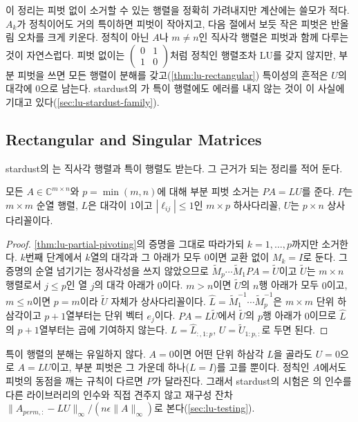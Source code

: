 이 정리는 피벗 없이 소거할 수 있는 행렬을 정확히 가려내지만 계산에는 쓸모가 적다. $A_k$가 정칙이어도 거의 특이하면 피벗이 작아지고, 다음 절에서 보듯 작은 피벗은 반올림 오차를 크게 키운다. 정칙이 아닌 $A$나 $m\ne n$인 직사각 행렬은 피벗과 함께 다루는 것이 자연스럽다. 피벗 없이는 $\begin{pmatrix}0&1\\1&0\end{pmatrix}$처럼 정칙인 행렬조차 LU를 갖지 않지만, 부분 피벗을 쓰면 모든 행렬이 분해를 갖고(\cref{thm:lu-rectangular}) 특이성의 흔적은 $U$의 대각에 $0$으로 남는다. stardust의 가 특이 행렬에도 에러를 내지 않는 것이 이 사실에 기대고 있다(\cref{sec:lu-stardust-family}).

\subsection{Rectangular and Singular Matrices}

stardust의 는 직사각 행렬과 특이 행렬도 받는다. 그 근거가 되는 정리를 적어 둔다.

\begin{theorem}
\label{thm:lu-rectangular}
모든 $A\in\mathbb C^{m\times n}$와 $p=\min(m,n)$에 대해 부분 피벗 소거는 $PA=LU$를 준다. $P$는 $m\times m$ 순열 행렬, $L$은 대각이 $1$이고 $|\ell_{ij}|\le1$인 $m\times p$ 하사다리꼴, $U$는 $p\times n$ 상사다리꼴이다.
\end{theorem}

\begin{proof}
\cref{thm:lu-partial-pivoting}의 증명을 그대로 따라가되 $k=1,\dots,p$까지만 소거한다. $k$번째 단계에서 $k$열의 대각과 그 아래가 모두 $0$이면 교환 없이 $M_k=I$로 둔다. 그 증명의 순열 넘기기는 정사각성을 쓰지 않았으므로 $\tilde M_p\cdots\tilde M_1PA=\tilde U$이고 $\tilde U$는 $m\times n$ 행렬로서 $j\le p$인 열 $j$의 대각 아래가 $0$이다. $m>n$이면 $\tilde U$의 $n$행 아래가 모두 $0$이고, $m\le n$이면 $p=m$이라 $\tilde U$ 자체가 상사다리꼴이다. $\hat L=\tilde M_1^{-1}\cdots\tilde M_p^{-1}$은 $m\times m$ 단위 하삼각이고 $p+1$열부터는 단위 벡터 $e_j$이다. $PA=\hat L\tilde U$에서 $\tilde U$의 $p$행 아래가 $0$이므로 $\hat L$의 $p+1$열부터는 곱에 기여하지 않는다. $L=\hat L_{:,1:p}$, $U=\tilde U_{1:p,:}$로 두면 된다.
\end{proof}

특이 행렬의 분해는 유일하지 않다. $A=0$이면 어떤 단위 하삼각 $L$을 골라도 $U=0$으로 $A=LU$이고, 부분 피벗은 그 가운데 하나($L=I$)를 고를 뿐이다. 정칙인 $A$에서도 피벗의 동점을 깨는 규칙이 다르면 $P$가 달라진다. 그래서 stardust의 시험은 의 인수를 다른 라이브러리의 인수와 직접 견주지 않고 재구성 잔차 $\|A_{\mathit{perm},:}-LU\|_\infty/(n\epsilon\|A\|_\infty)$로 본다(\cref{sec:lu-testing}).

